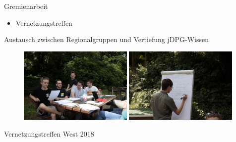 \documentclass[
]{beamer}
\begin{document}
\begin{frame}{Gremienarbeit}
  \vfill

   \begin{minipage}{0.4\textwidth}
     \begin{itemize}
       \item Vernetzungstreffen
     \end{itemize}
     \begin{center}
      Austausch zwischen Regionalgruppen und Vertiefung jDPG-Wissen
     \end{center}
   \end{minipage}%
   \hfill
   \begin{minipage}{0.58\textwidth}
     \begin{figure}
       \centering
       \includegraphics[width=0.49\textwidth]{figure/VT-West-2018_Austausch}\hfill
       \includegraphics[width=0.49\textwidth]{figure/VT-West-2018_wissen}
      \end{figure}
      \begin{center}
       Vernetzungstreffen West 2018
     \end{center}
   \end{minipage}
\end{frame}
\end{document}
